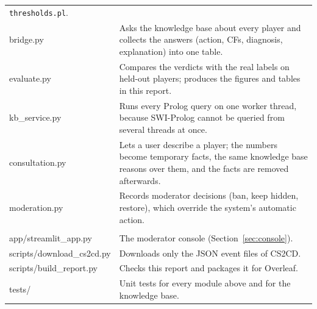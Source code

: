 \documentclass[11pt,a4paper]{article}
\newcommand{\code}[1]{\texttt{#1}}
\begin{document}
\begin{table}[H]
\begin{tabularx}{\textwidth}{@{}>{\ttfamily}l X@{}}
                    \code{thresholds.pl}. \\
bridge.py         & Asks the knowledge base about every player and collects the answers (action,
                    CFs, diagnosis, explanation) into one table. \\
evaluate.py       & Compares the verdicts with the real labels on held-out players; produces the
                    figures and tables in this report. \\
kb\_service.py    & Runs every Prolog query on one worker thread, because SWI-Prolog cannot be
                    queried from several threads at once. \\
consultation.py   & Lets a user describe a player; the numbers become temporary facts, the same
                    knowledge base reasons over them, and the facts are removed afterwards. \\
moderation.py     & Records moderator decisions (ban, keep hidden, restore), which override the
                    system's automatic action. \\
\midrule
\multicolumn{2}{@{}l}{\textit{Other}} \\
app/streamlit\_app.py & The moderator console (Section~\ref{sec:console}). \\
scripts/download\_cs2cd.py & Downloads only the JSON event files of CS2CD. \\
scripts/build\_report.py   & Checks this report and packages it for Overleaf. \\
tests/            & Unit tests for every module above and for the knowledge base. \\
\bottomrule
\end{tabularx}
\end{table}
\end{document}
